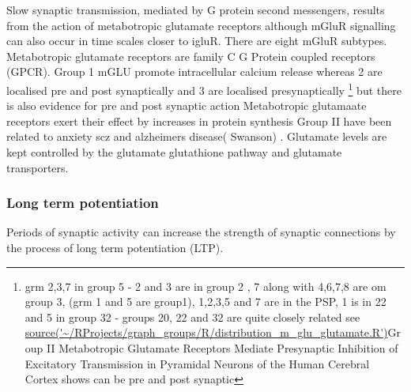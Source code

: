 Slow synaptic transmission, mediated by G protein second messengers, results from the action of metabotropic glutamate receptors \cite{niswender2010metabotropic} although mGluR signalling can also occur in time scales closer to igluR. There are eight mGluR subtypes. Metabotropic glutamate receptors are family C G Protein coupled receptors (GPCR). Group 1 mGLU promote intracellular calcium release whereas 2 are localised pre and post synaptically  and 3 are localised presynaptically \cite{niswender2010metabotropic} \footnote{grm 2,3,7 in group 5 - 2 and 3 are in group 2 , 7 along with 4,6,7,8 are om group 3, (grm 1 and 5 are group1), 1,2,3,5 and 7 are in the PSP, 1 is in 22 and 5 in group 32 - groups 20, 22 and 32 are quite closely related see \url{ source('~/RProjects/graph_groups/R/distribution_m_glu_glutamate.R')}Group II Metabotropic Glutamate Receptors Mediate Presynaptic Inhibition of Excitatory Transmission in Pyramidal Neurons of the Human Cerebral Cortex shows can be pre and post synaptic } but there is also evidence for pre and post synaptic action 
Metabotropic glutamaate receptors exert their effect by increases in protein synthesis Group II have been related to anxiety scz and alzheimers disease( Swanson) .
Glutamate levels are kept controlled by the glutamate glutathione pathway and glutamate transporters. 

\subsubsection{Long term potentiation}
Periods of synaptic activity can increase the strength of synaptic connections by the process of long term potentiation (LTP).

